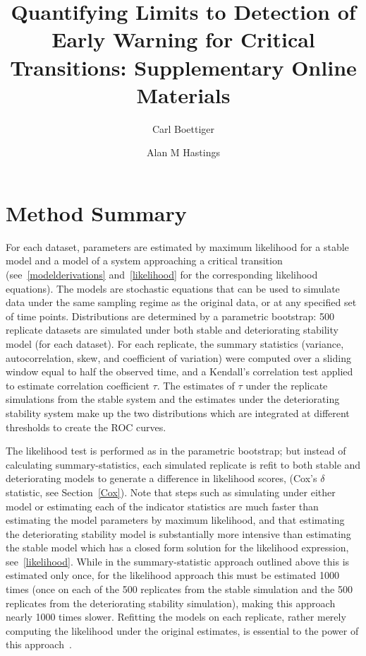 \documentclass[authoryear, preprint,review,12pt]{elsarticle}
\begin{document}
\begin{frontmatter}
\title{Quantifying Limits to Detection of Early Warning for Critical Transitions: Supplementary Online Materials}
\author[davis]{Carl Boettiger}
\author[davis]{Alan M Hastings}
\address[davis]{Center for Population Biology, University of California, Davis, United States}
\end{frontmatter}

\appendix
\renewcommand*\thefigure{S\arabic{figure}}
\renewcommand*\theequation{S\arabic{equation}}

\section{Method Summary}
For each dataset, parameters are estimated by maximum likelihood for a stable model and a model of a system approaching a critical transition (see~\ref{modelderivations} and~\ref{likelihood} for the corresponding likelihood equations).  The models are stochastic equations that can be used to simulate data under the same sampling regime as the original data, or at any specified set of time points.  Distributions are determined by a parametric bootstrap: 500 replicate datasets are simulated under both stable and deteriorating stability model (for each dataset).  For each replicate, the summary statistics (variance, autocorrelation, skew, and coefficient of variation) were computed over a sliding window equal to half the observed time, and a Kendall's correlation test applied to estimate correlation coefficient $\tau$.  The estimates of $\tau$ under the replicate simulations from the stable system and the estimates under the deteriorating stability system make up the two distributions which are integrated at different thresholds to create the ROC curves.  

The likelihood test is performed as in the parametric bootstrap; but instead of calculating summary-statistics, each simulated replicate is refit to both stable and deteriorating models to generate a difference in likelihood scores, (Cox's $\delta$ statistic, see Section~\ref{Cox}).  Note that steps such as simulating under either model or estimating each of the indicator statistics are much faster than estimating the model parameters by maximum likelihood, and that estimating the deteriorating stability model is substantially more intensive than estimating the stable model which has a closed form solution for the likelihood expression, see~\ref{likelihood}.  While in the summary-statistic approach outlined above this is estimated only once, for the likelihood approach this must be estimated 1000 times (once on each of the 500 replicates from the stable simulation and the 500 replicates from the deteriorating stability simulation), making this approach nearly 1000 times slower.  Refitting the models on each replicate, rather merely computing the likelihood under the original estimates, is essential to the power of this approach~\citep{Huelsenbeck1996}.
\end{document}
